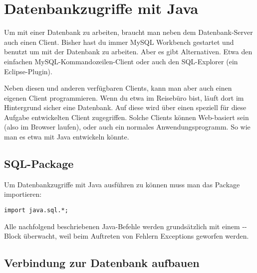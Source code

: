 \chapter{Datenbankzugriffe mit Java}
\renewcommand{\chaptertitle}{Datenbankzugriffe mit Java}

\lehead[]{\sf\hspace*{-2.00cm}\textcolor{white}{\colorbox{lightblue}{\makebox[1.60cm][r]{\thechapter}}}\hspace{0.17cm}\textcolor{lightblue}{\chaptertitle}}
\rohead[]{\textcolor{lightblue}{\chaptertitle}\sf\hspace*{0.17cm}\textcolor{white}{\colorbox{lightblue}{\makebox[1.60cm][l]{\thechapter}}}\hspace{-2.00cm}}
\rehead[]{\textcolor{lightblue}{AvHG, Inf, My}}
\lohead[]{\textcolor{lightblue}{AvHG, Inf, My}}

\lstset{style=myJava}

Um mit einer Datenbank zu arbeiten, braucht man neben dem Datenbank-Server auch
einen Client. Bisher hast du immer MySQL Workbench gestartet und benutzt um mit
der Datenbank zu arbeiten. Aber es gibt Alternativen. Etwa den
einfachen MySQL-Kommandozeilen-Client oder auch den SQL-Explorer (ein
Eclipse-Plugin).

Neben diesen und anderen verfügbaren Clients, kann man aber auch einen eigenen
Client programmieren. Wenn du etwa im Reisebüro bist, läuft dort im Hintergrund
sicher eine Datenbank. Auf diese wird über einen speziell für diese Aufgabe
entwickelten Client zugegriffen. Solche Clients können Web-basiert sein (also
im Browser laufen), oder auch ein normales Anwendungsprogramm. So wie man es
etwa mit Java entwickeln könnte.

\section{SQL-Package}

Um Datenbankzugriffe mit Java ausführen zu können muss man das Package
 importieren:

\begin{lstlisting}
import java.sql.*;
\end{lstlisting}

Alle nachfolgend beschriebenen Java-Befehle werden grundsätzlich mit einem
--Block überwacht, weil beim Auftreten von Fehlern
Exceptions geworfen werden.

\section{Verbindung zur Datenbank aufbauen}

